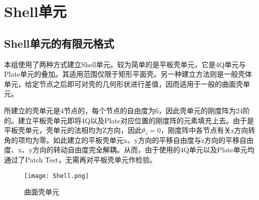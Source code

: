 \documentclass[forprint]{WHUBachelor}
\begin{document}
\section{Shell单元}
\subsection{Shell单元的有限元格式}
本组使用了两种方式建立Shell单元。较为简单的是平板壳单元，它是4Q单元与Plate单元的叠加。其适用范围仅限于矩形平面壳。另一种建立方法则是一般壳体单元，给定节点之后即可对壳的几何形状进行差值，因而适用于一般的曲面壳单元。

所建立的壳单元是4节点的，每个节点的自由度为6，因此壳单元的刚度阵为24阶的。建立平板壳单元即将4Q以及Plate对应位置的刚度阵的元素填充上去。由于是平板壳单元，壳单元的法相均为Z方向，因此$\theta_z=0$，刚度阵中各节点有关z方向转角的项均为零。如此建立的平板壳单元x、y方向的平移自由度与z方向的平移自由度、x、y方向的转动自由度完全解耦。从而，由于使用的4Q单元以及Plate单元均通过了Patch Test，无需再对平板壳单元作检验。

\begin{figure}[h]
	\centering
	\texttt{[image: Shell.png]}  
	\caption{曲面壳单元} 
	\label{fig:mcmthesis-logo}
\end{figure}
\end{document}
